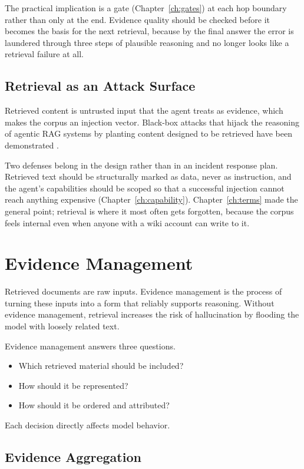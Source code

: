 The practical implication is a gate (Chapter~\ref{ch:gates}) at each hop boundary
rather than only at the end. Evidence quality should be checked before it becomes
the basis for the next retrieval, because by the final answer the error is
laundered through three steps of plausible reasoning and no longer looks like a
retrieval failure at all.

\subsection{Retrieval as an Attack Surface}

Retrieved content is untrusted input that the agent treats as evidence, which
makes the corpus an injection vector. Black-box attacks that hijack the reasoning
of agentic RAG systems by planting content designed to be retrieved have been
demonstrated \cite{kidnaprag2026}.

Two defenses belong in the design rather than in an incident response plan.
Retrieved text should be structurally marked as data, never as instruction, and
the agent's capabilities should be scoped so that a successful injection cannot
reach anything expensive (Chapter~\ref{ch:capability}). Chapter~\ref{ch:terms}
made the general point; retrieval is where it most often gets forgotten, because
the corpus feels internal even when anyone with a wiki account can write to it.

\section{Evidence Management}

Retrieved documents are raw inputs. Evidence management is the process of turning these inputs into a form that reliably supports reasoning. Without evidence management, retrieval increases the risk of hallucination by flooding the model with loosely related text.

Evidence management answers three questions.
\begin{itemize}
\item Which retrieved material should be included?
\item How should it be represented?
\item How should it be ordered and attributed?
\end{itemize}

Each decision directly affects model behavior.

\subsection{Evidence Aggregation}

